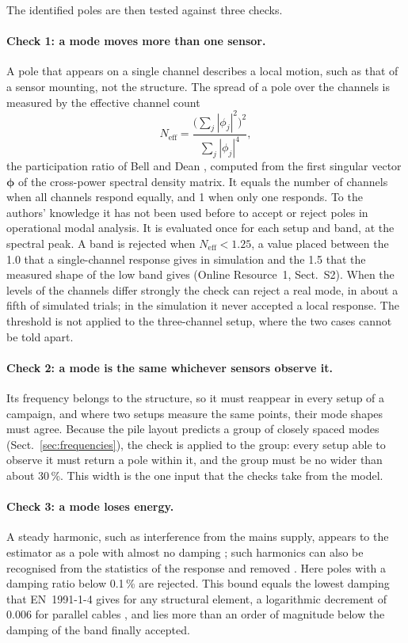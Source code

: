 \documentclass[11pt]{article}
\begin{document}
The identified poles are then tested against three checks.

\paragraph{Check 1: a mode moves more than one sensor.} A pole that appears on a single channel describes a local motion, such as that of a sensor mounting, not the structure. The spread of a pole over the channels is measured by the effective channel count
%
\begin{equation}
N_{\mathrm{eff}} = \frac{\bigl(\sum_j|\phi_j|^2\bigr)^2}{\sum_j|\phi_j|^4} ,
\label{eq:neff}
\end{equation}
%
the participation ratio of Bell and Dean \cite{bell1970,hodges1982}, computed from the first singular vector $\boldsymbol{\phi}$ of the cross-power spectral density matrix. It equals the number of channels when all channels respond equally, and 1 when only one responds. To the authors' knowledge it has not been used before to accept or reject poles in operational modal analysis. It is evaluated once for each setup and band, at the spectral peak. A band is rejected when $N_{\mathrm{eff}} < 1.25$, a value placed between the 1.0 that a single-channel response gives in simulation and the 1.5 that the measured shape of the low band gives (Online Resource~1, Sect.~S2). When the levels of the channels differ strongly the check can reject a real mode, in about a fifth of simulated trials; in the simulation it never accepted a local response. The threshold is not applied to the three-channel setup, where the two cases cannot be told apart.

\paragraph{Check 2: a mode is the same whichever sensors observe it.} Its frequency belongs to the structure, so it must reappear in every setup of a campaign, and where two setups measure the same points, their mode shapes must agree. Because the pile layout predicts a group of closely spaced modes (Sect.~\ref{sec:frequencies}), the check is applied to the group: every setup able to observe it must return a pole within it, and the group must be no wider than about 30\,\%. This width is the one input that the checks take from the model.

\paragraph{Check 3: a mode loses energy.} A steady harmonic, such as interference from the mains supply, appears to the estimator as a pole with almost no damping \cite{mohanty2004,jacobsen2005}; such harmonics can also be recognised from the statistics of the response \cite{brincker2000,jacobsen2007} and removed \cite{motte2015,gres2021}. Here poles with a damping ratio below 0.1\,\% are rejected. This bound equals the lowest damping that EN~1991-1-4 gives for any structural element, a logarithmic decrement of 0.006 for parallel cables \cite{en1991}, and lies more than an order of magnitude below the damping of the band finally accepted.
\end{document}
